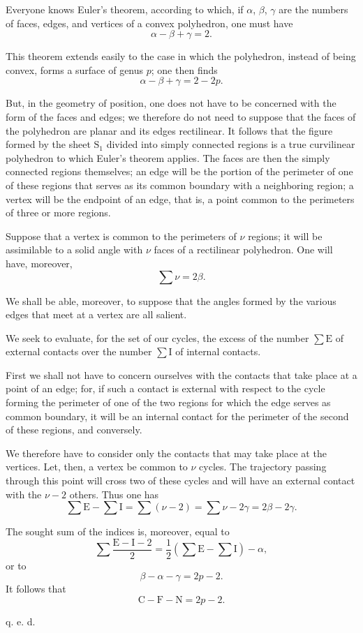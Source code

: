 \documentclass[11pt]{article}
\begin{document}
Everyone knows Euler’s theorem, according to which, if $\alpha$, $\beta$, $\gamma$ are the numbers of faces, edges, and vertices of a convex polyhedron, one must have
\[
\alpha-\beta+\gamma=2.
\]

This theorem extends easily to the case in which the polyhedron, instead of being convex, forms a surface of genus $p$; one then finds
\[
\alpha-\beta+\gamma=2-2p.
\]

But, in the geometry of position, one does not have to be concerned with the form of the faces and edges; we therefore do not need to suppose that the faces of the polyhedron are planar and its edges rectilinear. It follows that the figure formed by the sheet $\mathrm{S}_1$ divided into simply connected regions is a true curvilinear polyhedron to which Euler’s theorem applies. The faces are then the simply connected regions themselves; an edge will be the portion of the perimeter of one of these regions that serves as its common boundary with a neighboring region; a vertex will be the endpoint of an edge, that is, a point common to the perimeters of three or more regions.

Suppose that a vertex is common to the perimeters of $\nu$ regions; it will be assimilable to a solid angle with $\nu$ faces of a rectilinear polyhedron. One will have, moreover,
\[
\sum \nu=2\beta.
\]

We shall be able, moreover, to suppose that the angles formed by the various edges that meet at a vertex are all salient.

We seek to evaluate, for the set of our cycles, the excess of the number $\sum\mathrm{E}$ of external contacts over the number $\sum\mathrm{I}$ of internal contacts.

First we shall not have to concern ourselves with the contacts that take place at a point of an edge; for, if such a contact is external with respect to the cycle forming the perimeter of one of the two regions for which the edge serves as common boundary, it will be an internal contact for the perimeter of the second of these regions, and conversely.

We therefore have to consider only the contacts that may take place at the vertices. Let, then, a vertex be common to $\nu$ cycles. The trajectory passing through this point will cross two of these cycles and will have an external contact with the $\nu-2$ others. Thus one has
\[
\sum\mathrm{E}-\sum\mathrm{I}=\sum(\nu-2)=\sum\nu-2\gamma=2\beta-2\gamma.
\]

The sought sum of the indices is, moreover, equal to
\[
\sum \frac{\mathrm{E}-\mathrm{I}-2}{2}
=\frac12\left(\sum\mathrm{E}-\sum\mathrm{I}\right)-\alpha,
\]
or to
\[
\beta-\alpha-\gamma=2p-2.
\]
It follows that
\[
\mathrm{C}-\mathrm{F}-\mathrm{N}=2p-2.
\]
\begin{flushright}q. e. d.\end{flushright}
\end{document}
